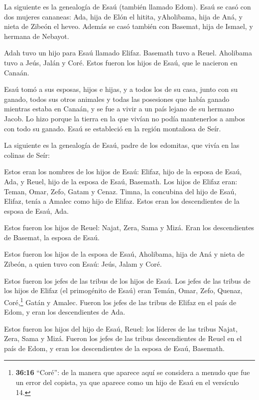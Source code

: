  La siguiente es la genealogía de Esaú (también llamado
Edom).  Esaú se casó con dos mujeres cananeas: Ada, hija de
Elón el hitita, yAholibama, hija de Aná, y nieta de Zibeón el heveo.
 Además se casó también con Basemat, hija de Ismael, y
hermana de Nebayot.

 Adah tuvo un hijo para Esaú llamado Elifaz. Basemath tuvo a
Reuel.  Aholibama tuvo a Jeús, Jalán y Coré. Estos fueron
los hijos de Esaú, que le nacieron en Canaán.

 Esaú tomó a sus esposas, hijos e hijas, y a todos los de su
casa, junto con su ganado, todos sus otros animales y todas las
posesiones que había ganado mientras estaba en Canaán, y se fue a vivir
a un país lejano de su hermano Jacob.  Lo hizo porque la
tierra en la que vivían no podía mantenerlos a ambos con todo su ganado.
 Esaú se estableció en la región montañosa de Seír.

 La siguiente es la genealogía de Esaú, padre de los
edomitas, que vivía en las colinas de Seír:

 Estos eran los nombres de los hijos de Esaú: Elifaz, hijo
de la esposa de Esaú, Ada, y Reuel, hijo de la esposa de Esaú, Basemath.
 Los hijos de Elifaz eran: Teman, Omar, Zefo, Gatam y
Cenaz.  Timna, la concubina del hijo de Esaú, Elifaz, tenía
a Amalec como hijo de Elifaz. Estos eran los descendientes de la esposa
de Esaú, Ada.

 Estos fueron los hijos de Reuel: Najat, Zera, Sama y Mizá.
Eran los descendientes de Basemat, la esposa de Esaú.

 Estos fueron los hijos de la esposa de Esaú, Aholibama,
hija de Aná y nieta de Zibeón, a quien tuvo con Esaú: Jeús, Jalam y
Coré.

 Estos fueron los jefes de las tribus de los hijos de Esaú.
Los jefes de las tribus de los hijos de Elifaz (el primogénito de Esaú)
eran Temán, Omar, Zefo, Quenaz,  Coré,\footnote{\textbf{36:16}
  ``Coré'': de la manera que aparece aquí se considera a menudo que fue
  un error del copista, ya que aparece como un hijo de Esaú en el
  versículo 14.} Gatán y Amalec. Fueron los jefes de las tribus de
Elifaz en el país de Edom, y eran los descendientes de Ada.

 Estos fueron los hijos del hijo de Esaú, Reuel: los
líderes de las tribus Najat, Zera, Sama y Mizá. Fueron los jefes de las
tribus descendientes de Reuel en el país de Edom, y eran los
descendientes de la esposa de Esaú, Basemath.

